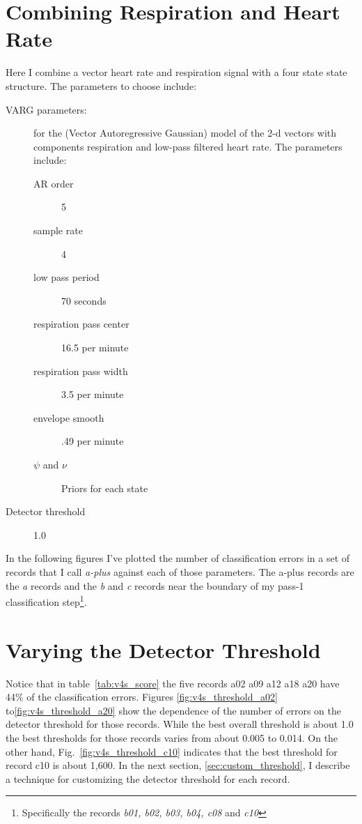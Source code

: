 \documentclass[12pt]{article}
\begin{document}
\section{Combining Respiration and Heart Rate}
\label{sec:combination}

Here I combine a vector heart rate and respiration signal with a four
state state structure.  The parameters to choose
include:
\begin{description}
\item[VARG parameters:] for the (Vector Autoregressive Gaussian) model
  of the 2-d vectors with components respiration and low-pass filtered
  heart rate.  The parameters include:
  \begin{description}
  \item[AR order] 5 %
  \item[sample rate] 4 %
  \item[low pass period] 70 seconds %
  \item[respiration pass center] 16.5 per minute %
  \item[respiration pass width] 3.5 per minute %
  \item[envelope smooth] .49 per minute %
  \item[$\psi$ and $\nu$] Priors for each state
  \end{description}
\item[Detector threshold] 1.0
\end{description}
In the following figures I've plotted the number of classification
errors in a set of records that I call \emph{a-plus} against each of
those parameters.  The a-plus records are the \emph{a} records and the
\emph{b} and \emph{c} records near the boundary of my pass-1
classification step\footnote{Specifically the records \emph{b01, b02,
    b03, b04, c08} and \emph{c10}}.


\clearpage %
\section{Varying the Detector Threshold}
\label{sec:threshold}

Notice that in table~\ref{tab:v4s_score} the five records a02 a09 a12
a18 a20 have 44\% of the classification errors.  Figures
\ref{fig:v4s_threshold_a02} to\ref{fig:v4s_threshold_a20} show the
dependence of the number of errors on the detector threshold for
those records.  While the best overall threshold is about 1.0 the best
thresholds for those records varies from about 0.005 to 0.014.  On the
other hand, Fig.~\ref{fig:v4s_threshold_c10} indicates that the best
threshold for record c10 is about 1,600.  In the next section,
\ref{sec:custom_threshold}, I describe a technique for customizing the
detector threshold for each record.
\end{document}
